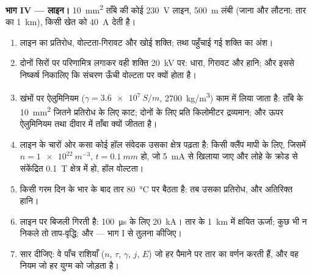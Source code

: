 \begin{problem}[{सप्ताहांत समस्या --- घर के तार का एक मीटर, चार पैमानों पर
जाँचा गया: इलेक्ट्रॉन, स्थानिक नियम, परिपथ, और
विद्युत-लाइन}]
\medskip
\noindent\textbf{भाग IV --- लाइन।}
\qty{10}{mm^2} ताँबे की कोई \qty{230}{V} लाइन, \qty{500}{m} लंबी (जाना और लौटना:
तार का \qty{1}{km}), किसी खेत को \qty{40}{A} देती है।
\begin{enumerate}[resume]
  \item लाइन का प्रतिरोध, वोल्टता-गिरावट और खोई शक्ति; तथा
        पहुँचाई गई शक्ति का अंश।
  \item दोनों सिरों पर परिणामित्र लगाकर वही शक्ति \qty{20}{kV} पर:
        धारा, गिरावट और हानि; और इससे निष्कर्ष निकालिए कि संचरण
        ऊँची वोल्टता पर क्यों होता है।
  \item खंभों पर ऐलुमिनियम ($\gamma = \qty{3.6e7}{S/m}$, \qty{2700}{kg/m^3}) काम में
        लिया जाता है: ताँबे के \qty{10}{mm^2} जितने प्रतिरोध के लिए
        काट; दोनों के लिए प्रति किलोमीटर द्रव्यमान; और ऊपर ऐलुमिनियम
        तथा दीवार में ताँबा क्यों जीतता है।
  \item लाइन के चारों ओर कसा कोई हॉल संवेदक उसका क्षेत्र पढ़ता है: किसी
        क्लैंप मापी के लिए, जिसमें $n = \qty{1e22}{m^{-3}}$, $t = \qty{0.1}{mm}$ हो, जो
        \qty{5}{mA} से खिलाया जाए और लोहे के क्रोड से संकेंद्रित \qty{0.1}{T} क्षेत्र में हो,
        हॉल वोल्टता।
  \item किसी गरम दिन के भार के बाद तार \qty{80}{\degreeCelsius} पर बैठता है:
        तब उसका प्रतिरोध, और अतिरिक्त हानि।
  \item लाइन पर बिजली गिरती है: \qty{100}{\micro s} के लिए \qty{20}{kA}। तार के
        \qty{1}{km} में क्षयित ऊर्जा; कुछ भी न निकले तो ताप-वृद्धि;
        और  --- भाग I से तुलना कीजिए।
  \item सार दीजिए: वे पाँच राशियाँ ($n$, $\tau$, $\gamma$, $j$, $E$) जो
        हर पैमाने पर तार का वर्णन करती हैं, और वह नियम जो हर
        युग्म को जोड़ता है।
\end{enumerate}
\end{problem}
